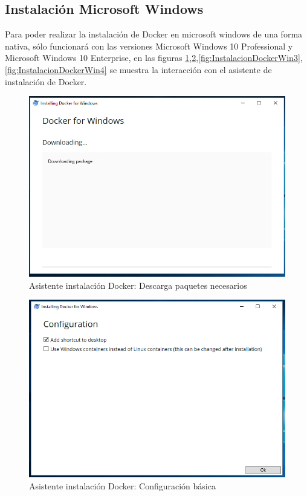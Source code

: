 \subsection{Instalación Microsoft Windows}
Para poder realizar la instalación de Docker en microsoft windows de una forma nativa, sólo funcionará con las versiones Microsoft Windows 10 Professional y Microsoft Windows 10 Enterprise, en las figuras \ref{fig:InstalacionDockerWin1},\ref{fig:InstalacionDockerWin2},\ref{fig:InstalacionDockerWin3},\ref{fig:InstalacionDockerWin4} se muestra la interacción con el asistente de instalación de Docker.

\begin{figure}[!hbtp]
	\centering
	\includegraphics[width=\linewidth]{RE05_Docker/Instalacion_Windows/REDocker_Instalacion_Windows01.png}
	\vspace{-0.2cm}
	\caption{Asistente instalación Docker: Descarga paquetes necesarios}
	\label{fig:InstalacionDockerWin1}
\end{figure}

\begin{figure}[!hbtp]
	\centering
	\includegraphics[width=\linewidth]{RE05_Docker/Instalacion_Windows/REDocker_Instalacion_Windows02.png}
	\vspace{-0.2cm}
	\caption{Asistente instalación Docker: Configuración básica}
	\label{fig:InstalacionDockerWin2}
\end{figure}

